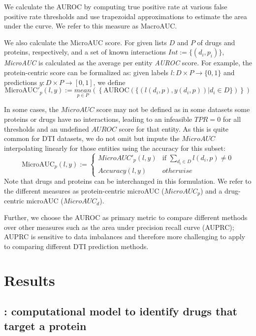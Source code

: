 \documentclass{bioinfo}
\renewcommand{\cite}{\citep}
\begin{document}
We calculate the AUROC by computing true positive rate at various
false positive rate thresholds and use trapezoidal approximations to
estimate the area under the curve. We refer to this measure as
$\textrm{MacroAUC}$.

We also calculate the $\textrm{MicroAUC}$ score. For given lists $D$
and $P$ of drugs and proteins, respectively, and a set of known
interactions $Int := \{(d_i, p_i) \}$, \textit{MicroAUC} is calculated
as the average per entity \textit{AUROC} score. For example, the
protein-centric score can be formalized as: given labels
$l:D\times P \rightarrow \{0,1\}$ and predictions
$y:D\times P \rightarrow [0,1]$, we define
\begin{equation*}
  \textrm{MicroAUC}'_p(l,y) := \underset{p\in P}{mean}\left(\left\{
      \text{AUROC}(\{ (l(d_i, p), y(d_i,p))| d_i\in D\})
    \right\}\right)
\end{equation*}

In some cases, the $MicroAUC$ score may not be defined as in some
datasets some proteins or drugs have no interactions, leading to an
infeasible $TPR=0$ for all thresholds and an undefined $AUROC$ score
for that entity. As this is quite common for DTI datasets, we do not
omit but impute the $MicroAUC$ interpolating linearly for those
entities using the accuracy for this subset:
\begin{equation*}
	\textrm{MicroAUC}_p(l,y) := 
	\begin{cases}
		MicroAUC'_p(l,y) & \text{if }\sum_{d_i\in
                  D}l(d_i,p)\neq 0\\
		Accuracy(l,y)&otherwise
	\end{cases}
\end{equation*}
Note that drugs and proteins can be interchanged in this formulation. We refer
to the different measures as protein-centric microAUC ($MicroAUC_p$)
and a drug-centric microAUC ($MicroAUC_d$).

Further, we choose the AUROC as primary metric to compare different
methods over other measures such as the area under precision recall
curve (AUPRC); AUPRC is sensitive to data imbalances \cite{Jeni2013}
and therefore more challenging to apply to comparing different DTI
prediction methods.

\section{Results}

\subsection{\name{}: computational model to identify drugs that target a
  protein}
\end{document}

